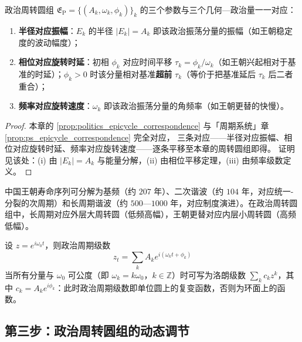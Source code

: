 \begin{proposition}\label{prop:politics_epicycle_correspondence}
政治周转圆组 $\mathfrak E_{\mathrm{P}}=\{(A_k,\omega_k,\phi_k)\}_{k}$ 的三个参数与三个几何—政治量一一对应：
\begin{enumerate}[label=(\roman*)]
    \item \textbf{半径对应振幅}：$E_k$ 的半径 $|E_k|=A_k$ 即该政治振荡分量的振幅（如王朝稳定度的波动幅度）；
    \item \textbf{相位对应旋转时延}：初相 $\phi_k$ 对应时间平移 $\tau_k=\phi_k/\omega_k$（如王朝兴起相对于基准的时延）；$\phi_k>0$ 时该分量相对基准\textbf{超前} $\tau_k$（等价于把基准延后 $\tau_k$ 后二者重合）；
    \item \textbf{频率对应旋转速度}：$\omega_k$ 即该政治振荡分量的角频率（如王朝更替的快慢）。
\end{enumerate}
\end{proposition}

\begin{proof}
本章的 \cref{prop:politics_epicycle_correspondence} 与「周期系统」章 \cref{prop:ps_epicycle_correspondence} 完全对应，
三条对应——半径对应振幅、相位对应旋转时延、频率对应旋转速度——逐条平移至本章的周转圆组即得。
证明见该处：(i) 由 $|E_k|=A_k$ 与能量分解，(ii) 由相位平移定理，(iii) 由频率级数定义。
\end{proof}

\begin{example}[政治时间序列的周期级数]\label{ex:politics_series_example}
中国王朝寿命序列可分解为基频（约 $207$ 年）、二次谐波（约 $104$ 年，对应统一-分裂的次周期）和长周期谐波（约 $500$—$1000$ 年，对应制度演进）。在政治周转圆组中，长周期对应外层大周转圆（低频高幅），王朝更替对应内层小周转圆（高频低幅）。
\end{example}

\begin{remark}[周期级数即复变函数]\label{rem:politics_series_complex}
设 $z=e^{i\omega_0t}$，则政治周期级数
\[
z_t=\sum_k A_k e^{i(\omega_k t+\phi_k)}
\]
当所有分量与 $\omega_0$ 可公度（即 $\omega_k=k\omega_0$，$k\in\mathbb Z$）时可写为洛朗级数 $\sum_k c_k z^k$，其中 $c_k=A_k e^{i\phi_k}$：此时政治周期级数即单位圆上的复变函数，否则为环面上的函数。
\end{remark}

\subsection{第三步：政治周转圆组的动态调节}


